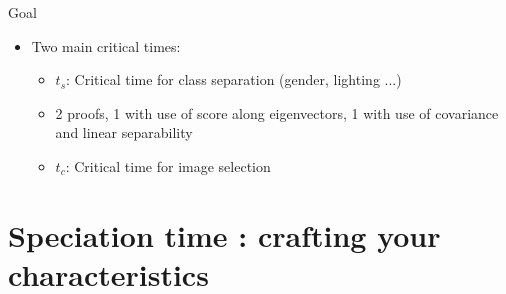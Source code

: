 \documentclass[aspectratio=169]{beamer}
\begin{document}
\begin{frame}{Goal}
    \begin{itemize}
        \item Two main critical times:
        \begin{itemize}
            \item $t_s$: Critical time for class separation (gender, lighting ...)
            \item 2 proofs, 1 with use of score along eigenvectors, 1 with use of covariance and linear separability
        \end{itemize}
        
        \begin{center}
        \end{center}
        
        \begin{itemize}
            \item $t_c$: Critical time for image selection
        \end{itemize}
           
        \begin{center}
        \end{center}
    \end{itemize}
\end{frame}











\section{Speciation time : crafting your characteristics}
\end{document}
